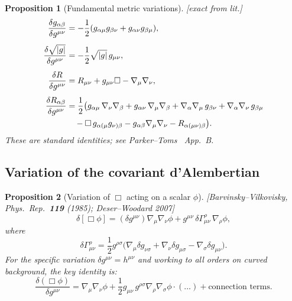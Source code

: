 \documentclass[12pt,a4paper]{article}
\newtheorem{proposition}{Proposition}[section]
\theoremstyle{definition}
\theoremstyle{remark}
\newcommand{\fromlit}[1]{\textcolor{blue!70!black}{\textsf{[#1]}}}
\newcommand{\exactlit}{\textcolor{blue!60!black}{\textsf{[exact from lit.]}}}
\begin{document}
\begin{proposition}[Fundamental metric variations]
\label{prop:metric-var}
\exactlit\;
\begin{align}
  \frac{\delta g_{\alpha\beta}}{\delta g^{\mu\nu}}
  &= -\frac{1}{2}(g_{\alpha\mu}g_{\beta\nu}
    + g_{\alpha\nu}g_{\beta\mu}),
  \label{eq:delta-g-lower}\\[4pt]
  \frac{\delta\sqrt{|g|}}{\delta g^{\mu\nu}}
  &= -\frac{1}{2}\sqrt{|g|}\,g_{\mu\nu},
  \label{eq:delta-sqrtg}\\[4pt]
  \frac{\delta R}{\delta g^{\mu\nu}}
  &= R_{\mu\nu} + g_{\mu\nu}\Box - \nabla_\mu\nabla_\nu,
  \label{eq:delta-R}\\[4pt]
  \frac{\delta R_{\alpha\beta}}{\delta g^{\mu\nu}}
  &= \frac{1}{2}\big(
    g_{\alpha\mu}\,\nabla_\nu\nabla_\beta
    + g_{\alpha\nu}\,\nabla_\mu\nabla_\beta
    + \nabla_\alpha\nabla_\mu\,g_{\beta\nu}
    + \nabla_\alpha\nabla_\nu\,g_{\beta\mu}
  \notag\\
  &\quad - \Box\,g_{\alpha(\mu}g_{\nu)\beta}
    - g_{\alpha\beta}\nabla_\mu\nabla_\nu
    - R_{\alpha(\mu\nu)\beta}
  \big).
  \label{eq:delta-Ricci}
\end{align}
These are standard identities; see
Parker--Toms~\cite{ParkerToms2009} App.~B.
\end{proposition}


\subsection{Variation of the covariant d'Alembertian}

\begin{proposition}[Variation of $\Box$ acting on a scalar $\phi$]
\label{prop:delta-box}
\fromlit{Barvinsky--Vilkovisky, Phys.\ Rep.\ \textbf{119} (1985);
Deser--Woodard 2007}
\begin{equation}\label{eq:delta-box}
  \delta[\Box\phi] = (\delta g^{\mu\nu})\nabla_\mu\nabla_\nu\phi
    + g^{\mu\nu}\,\delta\Gamma^\rho_{\mu\nu}\,\nabla_\rho\phi,
\end{equation}
where
\begin{equation}\label{eq:delta-Gamma}
  \delta\Gamma^\rho_{\mu\nu} = \frac{1}{2}g^{\rho\sigma}\big(
    \nabla_\mu\delta g_{\nu\sigma}
    + \nabla_\nu\delta g_{\mu\sigma}
    - \nabla_\sigma\delta g_{\mu\nu}\big).
\end{equation}
For the specific variation $\delta g^{\mu\nu} = h^{\mu\nu}$ and
working to all orders on curved background, the key identity is:
\begin{equation}\label{eq:delta-box-scalar}
  \frac{\delta(\Box\phi)}{\delta g^{\mu\nu}}
  = \nabla_\mu\nabla_\nu\phi
    + \frac{1}{2}g_{\mu\nu}\,g^{\rho\sigma}\nabla_\rho\nabla_\sigma\phi\cdot(\ldots)
    + \text{connection terms}.
\end{equation}
\end{proposition}
\end{document}
